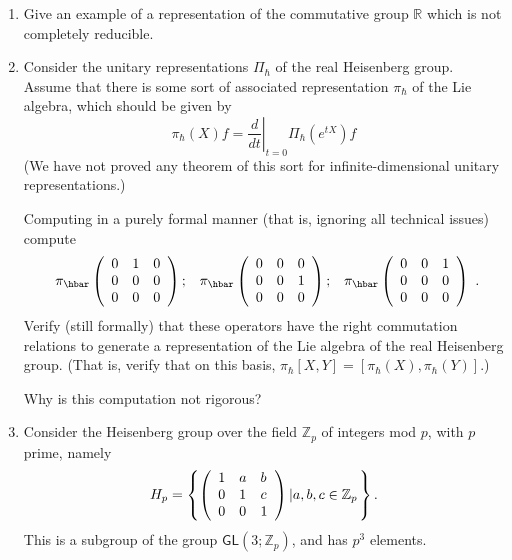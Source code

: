 \documentclass[12pt]{amsbook}
\theoremstyle{plain}
\numberwithin{equation}{chapter}
\numberwithin{theorem}{chapter}
\begin{document}
\begin{enumerate}
\item  Give an example of a representation of the commutative group
$\mathbb{R}$ which is not completely reducible.

\item \label{ccr}Consider the unitary representations $\Pi_{\hbar}$ of the
real Heisenberg group. Assume that there is some sort of associated
representation $\pi_{\hbar}$ of the Lie algebra, which should be given by
\[
\pi_{\hbar}(X)f=\left.  \frac{d}{dt}\right|  _{t=0}\Pi_{\hbar}\left(
e^{tX}\right)  f
\]
(We have not proved any theorem of this sort for infinite-dimensional unitary representations.)

Computing in a purely formal manner (that is, ignoring all technical issues)
compute
\[%
\begin{array}
[c]{ccc}%
\pi_{\hbar}\left(
\begin{array}
[c]{ccc}%
0 & 1 & 0\\
0 & 0 & 0\\
0 & 0 & 0
\end{array}
\right)  ; & \pi_{\hbar}\left(
\begin{array}
[c]{ccc}%
0 & 0 & 0\\
0 & 0 & 1\\
0 & 0 & 0
\end{array}
\right)  ; & \pi_{\hbar}\left(
\begin{array}
[c]{ccc}%
0 & 0 & 1\\
0 & 0 & 0\\
0 & 0 & 0
\end{array}
\right)
\end{array}
\text{.}%
\]
Verify (still formally) that these operators have the right commutation
relations to generate a representation of the Lie algebra of the real
Heisenberg group. (That is, verify that on this basis, $\pi_{\hbar}%
[X,Y]=[\pi_{\hbar}(X),\pi_{\hbar}(Y)]$.)

Why is this computation not rigorous?

\item \label{heisenberg.p}Consider the Heisenberg group over the field
$\mathbb{Z}_{p}$ of integers mod $p$, with $p$ prime, namely
\[
H_{p}=\left\{  \left(
\begin{array}
[c]{lll}%
1 & a & b\\
0 & 1 & c\\
0 & 0 & 1
\end{array}
\right)  \left|  a,b,c\in\mathbb{Z}_{p}\right.  \right\}  \text{.}%
\]
This is a subgroup of the group $\mathsf{GL}\left(  3;\mathbb{Z}_{p}\right)
$, and has $p^{3}$ elements.


\end{enumerate}
\end{document}
